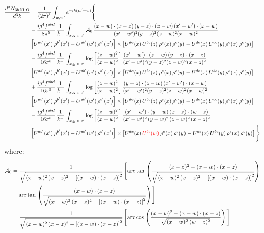 \documentclass[9pt]{article}
\newcommand{\chg}[1]{{\color{red}#1}}
\numberwithin{equation}{section}
\begin{document}
\begin{align}
\frac{d^{3}N_{3b\,\rm NLO}}{d^{3}k} & = \frac{1}{(2\pi)^{3}}\int_{w,w'}e^{-ik(w'-w)}\Bigg\{\notag \\
&-\frac{ig^{4}f^{abd}}{8\pi^{5}}\,\frac{1}{k^{+}}\,\int_{x,y,z,x'}\mathcal{A}_{0}\,
\frac{(x-w)\cdot(x-z)\,(y-z)\cdot(z-w)\,(x'-w')\cdot(x-w)}{(x'-w')^{2}(y-z)^{2}(z-w)^{2}(x-w)^{2}}\notag \\ & \left[U^{ab'}(x')\,\rho^{b'}(x')-U^{ab'}(w')\, \rho^{b'}(x')\right]\times \left[U^{de}(x)\,U^{bc}(z)\, \rho^{e}(x)\,\rho^{c}(y)-U^{de}(x)\,U^{bc}(y)\,\rho^{e}(x)\,\rho^{c}(y)\right] \notag \\
& -\frac{ig^{4}f^{abd}}{16\pi^{5}}\,\frac{1}{k^{+}}\,\int_{x,y,z,x'}\log{\left[\frac{(z-w)^{2}}{(x-w)^{2}}\right]}\,
\frac{(x'-w')\cdot(z-w)\,(y-z)\cdot(x-z)}{(x'-w')^{2}(y-z)^{2}(z-w)^{2}(x-z)^{2}}\notag \\
&\left[U^{ab'}(x')\,\rho^{b'}(x')-U^{ab'}(w')\, \rho^{b'}(x')\right]\times \left[U^{de}(x)\,U^{bc}(z)\, \rho^{e}(x)\,\rho^{c}(y)-U^{de}(x)\,U^{bc}(y)\,\rho^{e}(x)\,\rho^{c}(y)\right] \notag \\
&+ \frac{ig^{4}f^{abd}}{16\pi^{5}}\,\frac{1}{k^{+}}\,\int_{x,y,z,x'}\log{\left[\frac{(z-w)^{2}}{(x-w)^{2}}\right]}\,
\frac{(y-z)\cdot(z-w)\,(x'-w')\cdot(x-w)}{(x'-w')^{2}(y-z)^{2}(z-w)^{2}(x-w)^{2}}\notag \\ 
& \left[U^{ab'}(x')\,\rho^{b'}(x')-U^{ab'}(w')\, \rho^{b'}(x')\right]\times \left[U^{de}(x)\,U^{bc}(z)\, \rho^{e}(x)\,\rho^{c}(y)-U^{de}(x)\,U^{bc}(y)\,\rho^{e}(x)\,\rho^{c}(y)\right]\notag \\ & -\frac{ig^{4}f^{abd}}{16\pi^{5}}\,\frac{1}{k^{+}}\,\int_{x,y,z,x'}\log{\left[\frac{(z-w)^{2}}{(x-w)^{2}}\right]}\,\frac{(x'-w')\cdot(y-w)\,(x-z)\cdot (w-z)}{(x'-w')^{2}\,(y-w)^{2}\,(z-w)^{2}\,(x-z)^{2}}\notag \\ & \left[U^{ab'}(x')\,\rho^{b'}(x')-U^{ab'}(w')\, \rho^{b'}(x')\right]\times \left[U^{de}(x)\,\chg{U^{bc}(w)}\, \rho^{e}(x)\,\rho^{c}(y)-U^{de}(x)\,U^{bc}(y)\,\rho^{e}(x)\,\rho^{c}(y)\right]\Bigg\}
\end{align}
where: \begin{align}
\mathcal{A}_{0} & = \frac{1}{\sqrt{(x-w)^{2}\,(x-z)^{2}-\left[(x-w)\cdot (x-z)\right]^{2}}}\, \Bigg[\mathrm{arc\,tan}\,\left(\frac{(x-z)^{2}-(x-w)\cdot (x-z)}{\sqrt{(x-w)^{2}\,(x-z)^{2}-\left[(x-w)\cdot (x-z)\right]^{2}}}\right)\notag \\ & + \mathrm{arc\,tan}\,\left(\frac{(x-w)\cdot (x-z)}{\sqrt{(x-w)^{2}\,(x-z)^{2}-\left[(x-w)\cdot (x-z)\right]^{2}}}\right) \Bigg]\notag \\ & = \frac{1}{\sqrt{(x-w)^{2}\,(x-z)^{2}-\left[(x-w)\cdot (x-z)\right]^{2}}}\, \Bigg[\mathrm{arc\,cos}\,\left(\frac{(x-w)^{2}-(x-w)\cdot (x-z)}{\sqrt{(x-w)^{2}\,(w-z)^{2}}}\right)\Bigg]
\end{align}
\end{document}
